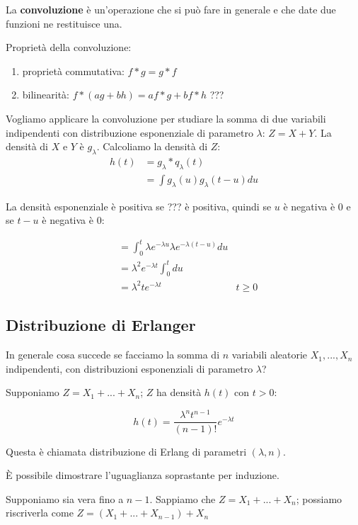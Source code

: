 \documentclass[a4paper,12pt]{book}
\begin{document}
La \textbf{convoluzione} è un'operazione che si può fare in generale e che date due funzioni ne restituisce una. 

Proprietà della convoluzione: 
\begin{enumerate}
	\item proprietà commutativa: $ f * g = g*f $
	\item bilinearità: $ f * (ag + bh ) = af * g + bf * h $ ??? %
\end{enumerate}

Vogliamo applicare la convoluzione per studiare la somma di due variabili indipendenti con distribuzione esponenziale di parametro $ \lambda $: $ Z = X + Y $. La densità di $ X $ e $ Y $ è $ g_\lambda $. Calcoliamo la densità di $ Z $:
\begin{align*}
	h(t) & = g_\lambda * q_\lambda(t) \\
	& = \int g_\lambda(u) g_\lambda(t-u) du
\end{align*}

La densità esponenziale è positiva se ??? %
è positiva, quindi se $ u $ è negativa è 0 e se $ t-u $ è negativa è 0: %

\begin{align*}
	& = \int_{0}^{t} \lambda e ^{-\lambda u} \lambda e^{-\lambda(t-u)} du \\
	& = \lambda^2 e^{-\lambda t} \int_{0}^{t} du \\
	& = \lambda^2 t e^{-\lambda t} & t \ge 0
\end{align*}

\subsection{Distribuzione di Erlanger} %
In generale cosa succede se facciamo la somma di $ n $ variabili aleatorie $ X_1, ..., X_n $ indipendenti, con distribuzioni esponenziali di parametro $\lambda$? 

Supponiamo $ Z = X_1 + ... + X_n $; $ Z $ ha densità $ h(t) $ con $ t > 0 $:

$$ h(t) = \frac{\lambda^n t^{n-1}}{(n-1)!} e^{-\lambda t} $$

Questa è chiamata distribuzione di Erlang di parametri $ (\lambda, n) $.

È possibile dimostrare l'uguaglianza soprastante per induzione. 

Supponiamo sia vera fino a $ n-1 $. Sappiamo che $ Z = X_1 + ... + X_n $; possiamo riscriverla come 
$ Z = (X_1 + ... + X_{n-1}) + X_n $
\end{document}
